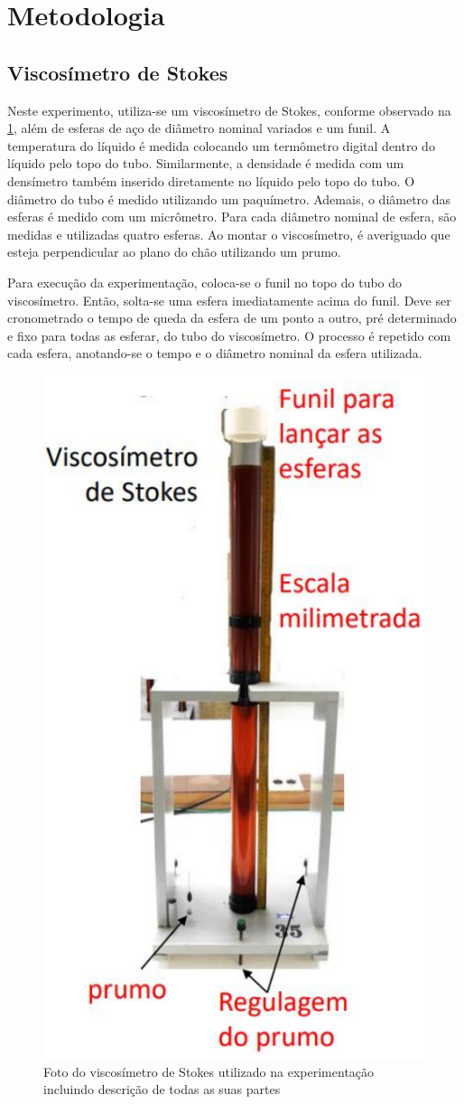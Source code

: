 \section{Metodologia}

\subsection{Viscosímetro de Stokes}
    Neste experimento, utiliza-se um viscosímetro de Stokes, conforme observado na \cref{viscosimetro.png}, além de esferas de aço de diâmetro nominal variados e um funil. A temperatura do líquido é medida colocando um termômetro digital dentro do líquido pelo topo do tubo. Similarmente, a densidade é medida com um densímetro também inserido diretamente no líquido pelo topo do tubo. O diâmetro do tubo é medido utilizando um paquímetro. Ademais, o diâmetro das esferas é medido com um micrômetro. Para cada diâmetro nominal de esfera, são medidas e utilizadas quatro esferas. Ao montar o viscosímetro, é averiguado que esteja perpendicular ao plano do chão utilizando um prumo. 
    
    Para execução da experimentação, coloca-se o funil no topo do tubo do viscosímetro. Então, solta-se uma esfera imediatamente acima do funil. Deve ser cronometrado o tempo de queda da esfera de um ponto a outro, pré determinado e fixo para todas as esferar, do tubo do viscosímetro. O processo é repetido com cada esfera, anotando-se o tempo e o diâmetro nominal da esfera utilizada.  

    \begin{figure}[H]
        \centering
        \includegraphics[width=0.3\linewidth]{fig/viscosimetro.png}
        \caption{Foto do viscosímetro de Stokes utilizado na experimentação incluindo descrição de todas as suas partes}
        \label{viscosimetro.png}
    \end{figure}

